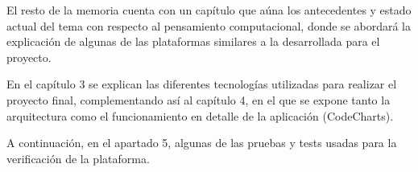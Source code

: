 El resto de la memoria cuenta con un capítulo que aúna los antecedentes y estado actual del tema con respecto al pensamiento computacional, donde se abordará la explicación de algunas de las plataformas similares a la desarrollada para el proyecto. 

En el capítulo 3 se explican las diferentes tecnologías utilizadas para realizar el proyecto final, complementando así al capítulo 4, en el que se expone tanto la arquitectura como el funcionamiento en detalle de la aplicación (CodeCharts). 

A continuación, en el apartado 5, algunas de las pruebas y tests usadas para la verificación de la plataforma.